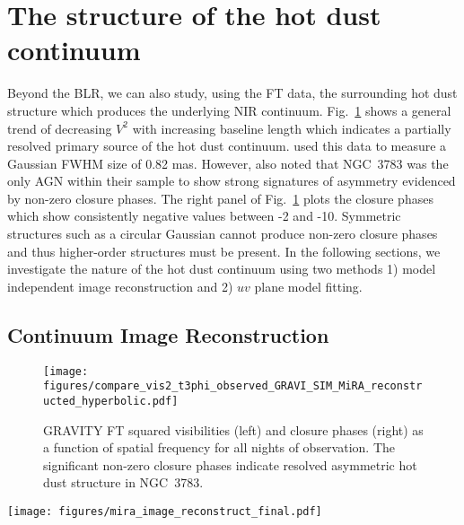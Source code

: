 \documentclass[longauth,]{aa}
\begin{document}
\section{The structure of the hot dust continuum}\label{sec:hot_dust}
Beyond the BLR, we can also study, using the FT data, the surrounding hot dust structure which produces the underlying NIR continuum. Fig.~\ref{fig:ft_vis2_t3phi} shows a general trend of decreasing $V^2$ with increasing baseline length which indicates a partially resolved primary source of the hot dust continuum.  used this data to measure a Gaussian FWHM size of 0.82 mas. However,  also noted that NGC~3783 was the only AGN within their sample to show strong signatures of asymmetry evidenced by non-zero closure phases. The right panel of Fig.~\ref{fig:ft_vis2_t3phi} plots the closure phases which show consistently negative values between -2\degree{} and -10\degree. Symmetric structures such as a circular Gaussian cannot produce non-zero closure phases and thus higher-order structures must be present. In the following sections, we investigate the nature of the hot dust continuum using two methods 1) model independent image reconstruction and 2) $uv$ plane model fitting. 

\subsection{Continuum Image Reconstruction}\label{sec:image_reconstruct}

\begin{figure}
\centering
\texttt{[image: figures/compare\_vis2\_t3phi\_observed\_GRAVI\_SIM\_MiRA\_reconstructed\_hyperbolic.pdf]}
\caption{GRAVITY FT squared visibilities (left) and closure phases (right) as a function of spatial frequency for all nights of observation. The significant non-zero closure phases indicate resolved asymmetric hot dust structure in NGC~3783.}
\label{fig:ft_vis2_t3phi}
\end{figure}



\begin{figure*}
\centering
\texttt{[image: figures/mira\_image\_reconstruct\_final.pdf]}
\caption{\texttt{MiRA} image reconstruction of the K-band continuum for NGC~3783. We used the \textit{hyperbolic} regularisation with a FOV of 25.6 mas and a pixel size of 0.1 mas. The image is normalized to the maximum pixel flux. The GRAVITY interferometric beam is shown as a white ellipse in the bottom left corner for comparison. North is up and East is to the left. }
\label{fig:mira_image}
\end{figure*}
\end{document}

